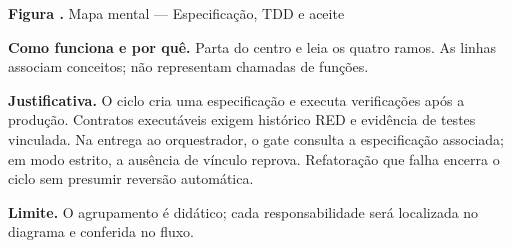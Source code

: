 {\small\textbf{Figura \thefigure.} Mapa mental --- Especificação, TDD e aceite}\par\smallskip
\noindent\textbf{Como funciona e por quê.} Parta do centro e leia os quatro ramos. As linhas associam conceitos; não representam chamadas de funções.\par
\noindent\textbf{Justificativa.} O ciclo cria uma especificação e executa verificações após a produção. Contratos executáveis exigem histórico RED e evidência de testes vinculada. Na entrega ao orquestrador, o gate consulta a especificação associada; em modo estrito, a ausência de vínculo reprova. Refatoração que falha encerra o ciclo sem presumir reversão automática.\par
\noindent\textbf{Limite.} O agrupamento é didático; cada responsabilidade será localizada no diagrama e conferida no fluxo.\par\smallskip
{}
